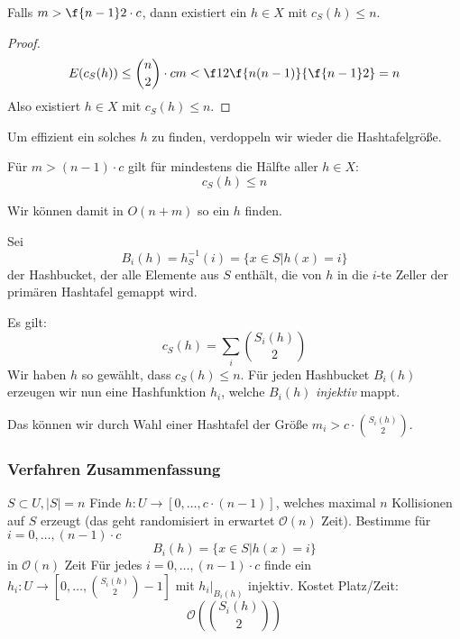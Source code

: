 \documentclass[11pt]{scrartcl}
\renewcommand{\O}{\mathcal{O}}
\begin{document}
\begin{kor}
	Falls $m>\f {n-1}2\cdot c$, dann existiert ein $h\in X$ mit $c_S(h)\le n$.
	\begin{proof}
		\[
			E(c_S(h)) \le \binom n2 \cdot cm < \f 12 \f {n(n-1)}{\f{n-1}2} = n
		\]
		Also existiert $h\in X$ mit $c_S(h)\le n$.
	\end{proof}
\end{kor}

Um effizient ein solches $h$ zu finden, verdoppeln  wir wieder die Hashtafelgröße.

\begin{kor}
	Für $m> (n-1)\cdot c$ gilt für mindestens die Hälfte aller $h\in X$:
	\[
		c_S(h) \le n
	\]
	\begin{note}
		Wir können damit in $O(n+m)$ so ein $h$ finden.
	\end{note}
\end{kor}

\begin{df}
	Sei 
	\[
		B_i(h) = h_S^{-1} (i) = \{x\in S\big| h(x)=i\}
	\]
	der Hashbucket, der alle Elemente aus $S$ enthält, die von $h$ in die $i$-te Zeller der primären Hashtafel gemappt wird.
\end{df}

Es gilt: 
\[
	c_S(h) = \sum_{i}\binom{S_i(h)}2
\]
Wir haben $h$ so gewählt, dass $c_S(h) \le n$.
Für jeden Hashbucket $B_i(h)$ erzeugen wir nun eine Hashfunktion $h_i$, welche $B_i(h)$ \emph{injektiv} mappt.

Das können wir durch Wahl einer Hashtafel der Größe $m_i > c\cdot \binom {S_i(h)}2$.


\subsubsection{Verfahren Zusammenfassung}

\begin{alg}
	\begin{algorithmic}
		\Require $S\subset U, |S| = n$
		\Statex
		\State Finde $h:U\to[0,\dotsc,c\cdot(n-1)]$, welches maximal $n$ Kollisionen auf $S$ erzeugt (das geht randomisiert in erwartet $\O(n)$ Zeit).
		\State Bestimme für $i=0,\dotsc, (n-1)\cdot c$
		\[
			B_i(h) = \{x\in S\big| h(x) = i\}
		\]
		in $\O(n)$ Zeit
		\State Für jedes $i=0,\dotsc, (n-1)\cdot c$ finde ein $h_i:U\to [0,\dotsc, \binom {S_i(h)}2 - 1]$ mit $h_i\big|_{B_i(h)}$ injektiv.
		Kostet Platz/Zeit:
		\[
			\O(\binom {S_i(h)}2)
		\]
	\end{algorithmic}
\end{alg}
\end{document}

